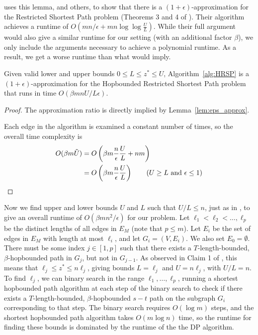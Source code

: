 \cite{LR01} uses this lemma, and others, to show that there is a $(1+\epsilon)$-approximation for the Restricted Shortest Path problem (Theorems 3 and 4 of \cite{LR01}). Their algorithm achieves a runtime of $O(m n/ \epsilon + m n \log \log \frac{U}{L})$. While their full argument would also give a similar runtime for our setting (with an additional factor $\beta$), we only include the arguments necessary to achieve a polynomial runtime. As a result, we get a worse runtime than what \cite{LR01} would imply. 

\begin{lemma} \label{lem:AS}
    Given valid lower and upper bounds $0 \leq L \leq z^* \leq U$, Algorithm~\ref{alg:HRSP} is a $(1+\epsilon)$-approximation for the Hopbounded Restricted Shortest Path problem that runs in time $O(\beta m n U / L \epsilon)$. 
\end{lemma}
\begin{proof}
The approximation ratio is directly implied by Lemma~\ref{lem:eps_approx}. 
    
Each edge in the algorithm is examined a constant number of times, so the overall time complexity is 
\begin{align*}
    O(\beta m \Tilde{U}) &= O\left( \beta m \frac{n}{\epsilon} \frac{U}{L} + nm \right) \\
    &= O\left( \beta m \frac{n}{\epsilon} \frac{U}{L}  \right) \tag{$U \geq L$ and $\epsilon \leq 1$}
\end{align*}
\end{proof}

Now we find upper and lower bounds $U$ and $L$ such that $U/L \leq n$, just as in \cite{LR01}, to give an overall runtime of $O(\beta m n^2 / \epsilon)$ for our problem. Let $\ell_1 < \ell_2 < \dots, \ell_p$ be the distinct lengths of all edges in $E_M$ (note that $p \leq m$). Let $E_i$ be the set of edges in $E_M$ with length at most $\ell_i$, and let $G_i = (V, E_i)$. We also set $E_0 = \emptyset$.
There must be some index $j \in [1,p]$ such that there exists a $T$-length-bounded, $\beta$-hopbounded path in $G_j$, but not in $G_{j-1}$. As observed in Claim 1 of \cite{LR01}, this means that $\ell_j \leq z^* \leq n \ell_j$, giving bounds $L = \ell_j$ and $U = n \ell_j$, with $U/L = n$. To find $\ell_j$, we can binary search in the range $\ell_1, \dots, \ell_p$, running a shortest hopbounded path algorithm at each step of the binary search to check if there exists a $T$-length-bounded, $\beta$-hopbounded $s-t$ path on the subgraph $G_i$ corresponding to that step. The binary search requires $O(\log m)$ steps, and the shortest hopbounded path algorithm takes $O(m \log n)$ time, so the runtime for finding these bounds is dominated by the runtime of the the DP algorithm. 


